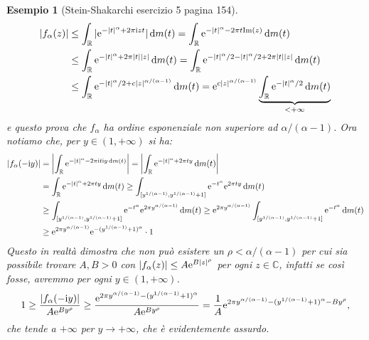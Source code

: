 \documentclass[11pt]{book}
\theoremstyle{Definizione}
\theoremstyle{TeoremaProposizioneLemmaCorollarioCongettura}
\theoremstyle{OsservazioneNotaEsempio}
\newtheorem{myes}{Esempio}[section]
\newcommand{\R}{\mathbb{R}}
\newcommand{\C}{\mathbb{C}}
\renewcommand{\Im}{\textup{Im}}
\renewcommand{\i}{\textup{i}}
\newcommand{\e}{\textup{e}}
\renewcommand{\d}{\mathrm{d}}
\begin{document}
\begin{myes}[Stein-Shakarchi esercizio 5 pagina 154]
\begin{align*}
|f_\alpha(z)| &\leq \int_\R |\e^{-|t|^\alpha+2\pi\i z t}|\, \d m (t) = \int_\R \e^{-|t|^\alpha-2\pi t \Im(z)} \,\d m(t) \\
&\leq \int_\R \e^{-|t|^\alpha+2\pi |t||z|} \,\d m(t) = \int_{\R}\e^{-|t|^\alpha/2-|t|^\alpha/2+2\pi |t| |z|}\,\d m(t) \\
&\leq \int_\R \e^{-|t|^\alpha/2+c|z|^{\alpha/(\alpha-1)}}\,\d m(t) = \e^{c|z|^{\alpha/(\alpha-1)}} \underbrace{\int_\R \e^{-|t|^\alpha/2}\, \d m(t)}_{<+\infty}
\end{align*}
e questo prova che $f_\alpha$ ha ordine esponenziale non superiore ad $\alpha/(\alpha-1)$. Ora notiamo che, per $y\in (1,+\infty)$ si ha:
\begin{align*}
|f_\alpha(-\i y)| &= \left|\int_\R \e^{-|t|^\alpha-2\pi \i t \i y\,\d m(t)}\right| = \left|\int_\R \e^{-|t|^\alpha+2\pi t y}\, \d m (t)\right|\\
&= \int_\R \e^{-|t|^\alpha+2\pi t y}\,\d m(t) \geq \int_{[y^{1/(\alpha-1)},y^{1/(\alpha-1)}+1]} \e^{-t^\alpha}\e^{2\pi t y}\,\d m (t)\\
&\geq \int_{[y^{1/(\alpha-1)},y^{1/(\alpha-1)}+1]} \e^{-t^\alpha} \e^{2\pi y^{\alpha/(\alpha-1)}}\,\d m (t) \geq \e^{2\pi y^{\alpha/(\alpha-1)}} \int_{[y^{1/(\alpha-1)},y^{1/(\alpha-1)}+1]} \e^{-t^\alpha}\,\d m (t)\\
&\geq \e^{2\pi y^{\alpha/(\alpha-1)}} \e^{-(y^{1/(\alpha-1)}+1)^\alpha} \cdot 1
\end{align*}
Questo in realtà dimostra che non può esistere un $\rho < \alpha/(\alpha-1)$ per cui sia possibile trovare $A,B > 0$ con $|f_\alpha(z)|\leq A\e^{B|z|^\rho}$ per ogni $z\in \C$, infatti se così fosse, avremmo per ogni $y\in (1,+\infty)$.
$$
1 \geq \frac{|f_\alpha(-\i y)|}{A \e^{B y^\rho}} \geq \frac{\e^{2\pi y^{\alpha/(\alpha-1)}-(y^{1/(\alpha-1)}+1)^\alpha}}{A\e^{By^\rho}} = \frac{1}{A}\e^{2\pi y^{\alpha/(\alpha-1)}-(y^{1/(\alpha-1)}+1)^\alpha-By^\rho},
$$
che tende a $+\infty$ per $y \to +\infty$, che è evidentemente assurdo.
\end{myes}
\end{document}
